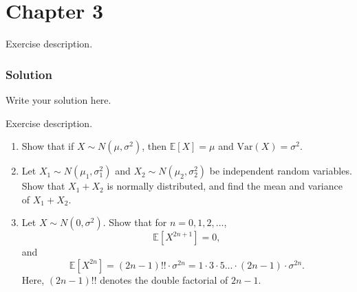\documentclass{article}
\begin{document}
\section{Chapter 3}

\exercise
Exercise description.
\subsubsection*{Solution}
Write your solution here.

\exercise
Exercise description.
\begin{enumerate}[label=(\alph*)]
    \item Show that if \( X \sim N(\mu, \sigma^2) \), then \( \mathbb{E}[X] = \mu \) and \( \text{Var}(X) = \sigma^2 \).
    \item Let \( X_1 \sim N(\mu_1, \sigma_1^2) \) and \( X_2 \sim N(\mu_2, \sigma_2^2) \) be independent random variables. Show that \( X_1 + X_2 \) is normally distributed, and find the mean and variance of \( X_1 + X_2 \).
    \item Let \( X \sim N(0,\sigma^2) \). Show that for \( n = 0, 1, 2, \ldots \),
    \[
    \mathbb{E}[X^{2n+1}] = 0, 
    \]
    and 
    \[
    \mathbb{E}[X^{2n}] = (2n-1)!! \cdot \sigma^{2n} = 1 \cdot 3 \cdot 5 ... \cdot (2n-1) \cdot \sigma^{2n}.
    \]
    Here, \( (2n-1)!! \) denotes the double factorial of \( 2n-1 \).
\end{enumerate}
\end{document}
